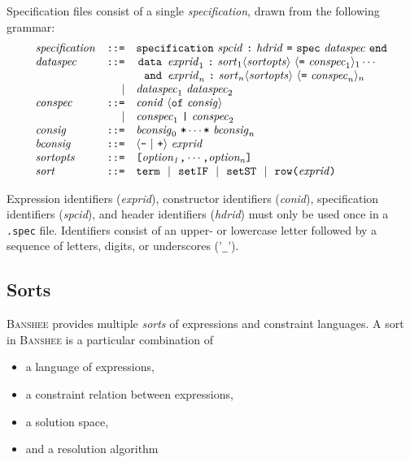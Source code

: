 \documentclass{article}
\def\kw#1{\hbox{\tt #1}}
\newcommand{\banshee}{\textsc{Banshee}}
\newcommand{\id}[1]{{\it #1\/}}
\newcommand{\bra}[1]{\langle {#1} \rangle}
\begin{document}
Specification files consist of a single \textit{specification}, drawn from
the following grammar:
$$
\begin{array}{lrl}
  \id{specification} &\kw{::=}& \kw{specification} ~\id{spcid} ~\kw{:}~ \id{hdrid} ~\kw{=} ~\kw{spec} ~\id{dataspec}~ \kw{end} \\
  \id{dataspec} & \kw{::=} & 
  \!\!\begin{array}[t]{rl}\kw{data} \!\!\! & \id{exprid}_1 ~\kw{:}~ \id{sort}_1 \bra{\id{sortopts}} 
               ~\bra{\kw{=} ~\id{conspec}_1}_1 \cdots \\ 
               \kw{and}\!\!\! & \id{exprid}_n ~\kw{:}~ \id{sort}_n \bra{\id{sortopts}} ~\bra{\kw{=} ~\id{conspec}_n}_n 
       \end{array} \\
  & | & \id{dataspec}_1 ~ \id{dataspec}_2 \\
  \id{conspec} & \kw{::=} & \id{conid} ~\bra{\kw{of} ~\id{consig}} \\
               & | & \id{conspec}_1~\kw{|} ~\id{conspec}_2 \\ 
 \id{consig} & \kw{::=} & \id{bconsig}_0~\kw{*} \cdots \kw{*}~\id{bconsig}_n \\
  \id{bconsig} & \kw{::=} & \bra{\kw{-}~|~\kw{+}} ~\id{exprid} \\ 
  \id{sortopts} & \kw{::=} & \kw{[} \id{option_1} \kw{,} \cdots \kw{,}\id{option_n} \kw{]} \\
  \id{sort} & \kw{::=} & \kw{term} ~~|~~ \kw{setIF} ~~|~~ \kw{setST} ~~|~~ \kw{row(}\id{exprid}\kw{)}  \\ 
 

\end{array}
$$

Expression identifiers (\textit{exprid}), constructor identifiers 
(\textit{conid}), specification identifiers (\textit{spcid}), and header 
identifiers (\textit{hdrid}) must only be used once in a \texttt{.spec} file. 
Identifiers consist of an upper- or lowercase letter followed by a sequence 
of letters, digits, or underscores ('\texttt{\_}').

\subsection{Sorts}

\banshee{} provides multiple \emph{sorts} of expressions and constraint 
languages. A sort in \banshee{} is a particular combination of
\begin{itemize}
        \item a language of expressions,
        \item a constraint relation between expressions,
        \item a solution space,
        \item and a resolution algorithm
\end{itemize}
\end{document}
